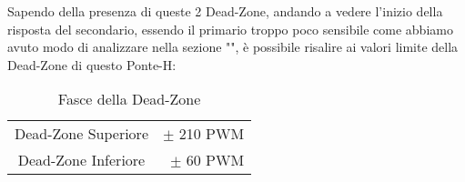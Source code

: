 \begin{enumerate}
\end{enumerate}
\noindent
Sapendo della presenza di queste 2 Dead-Zone, andando a vedere l'inizio della risposta del secondario, essendo il primario troppo poco sensibile come abbiamo avuto modo di analizzare nella sezione "", è possibile risalire ai valori limite della Dead-Zone di questo Ponte-H:
\begin{table}[h]
	\centering
	\begin{tabular}[t]{|c r|}
		\hline
		Dead-Zone Superiore & $\pm$ 210 PWM\\
		Dead-Zone Inferiore & $\pm$ 60  PWM\\
		\hline
	\end{tabular}
	\caption[Fasce della Dead-Zone]{Fasce della Dead-Zone}
\end{table}